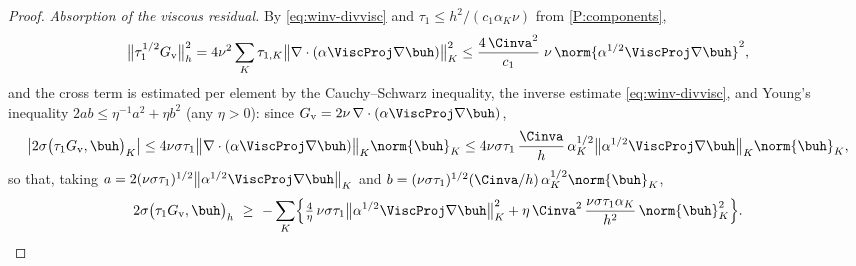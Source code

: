 \begin{proof}
\emph{Absorption of the viscous residual.}
By \eqref{eq:winv-divvisc} and $\tau_1\le h^2/(c_1\alpha_K\nu)$ from \ref{P:components},
\begin{equation}\label{eq:viscabsorb}
  \bigl\lVert\tau_1^{1/2}G_{\mathrm v}\bigr\rVert_h^2
  = 4\nu^2\sum_K\tau_{1,K}\bigl\lVert\nabla\cdot(\alpha\ViscProj\nabla\buh)\bigr\rVert_K^2
  \le \frac{4\,\Cinva^2}{c_1}\;\nu\,\norm{\alpha^{1/2}\ViscProj\nabla\buh}^2 ,
\end{equation}
and the cross term is estimated per element by the Cauchy--Schwarz inequality, the inverse
estimate \eqref{eq:winv-divvisc}, and Young's inequality $2ab\le\eta^{-1}a^2+\eta b^2$ (any
$\eta>0$): since $G_{\mathrm v}=2\nu\,\nabla\cdot(\alpha\ViscProj\nabla\buh)$,
\[
  \bigl|2\sigma\bigl(\tau_1 G_{\mathrm v},\buh\bigr)_K\bigr|
  \le 4\nu\sigma\tau_1\bigl\lVert\nabla\cdot(\alpha\ViscProj\nabla\buh)\bigr\rVert_K\norm{\buh}_K
  \le 4\nu\sigma\tau_1\,\frac{\Cinva}{h}\,\alpha_K^{1/2}
  \bigl\lVert\alpha^{1/2}\ViscProj\nabla\buh\bigr\rVert_K\norm{\buh}_K ,
\]
so that, taking $a=2(\nu\sigma\tau_1)^{1/2}\bigl\lVert\alpha^{1/2}\ViscProj\nabla\buh\bigr\rVert_K$
and $b=(\nu\sigma\tau_1)^{1/2}(\Cinva/h)\,\alpha_K^{1/2}\norm{\buh}_K$,
\begin{equation}\label{eq:crossbound}
  2\sigma\bigl(\tau_1 G_{\mathrm v},\buh\bigr)_h
  \ \ge\ -\sum_K\Bigl\{\tfrac{4}{\eta}\,\nu\sigma\tau_1\bigl\lVert\alpha^{1/2}\ViscProj\nabla\buh\bigr\rVert_K^2
  + \eta\,\Cinva^2\,\frac{\nu\sigma\tau_1\alpha_K}{h^2}\,\norm{\buh}_K^2\Bigr\}.
\end{equation}


\end{proof}
